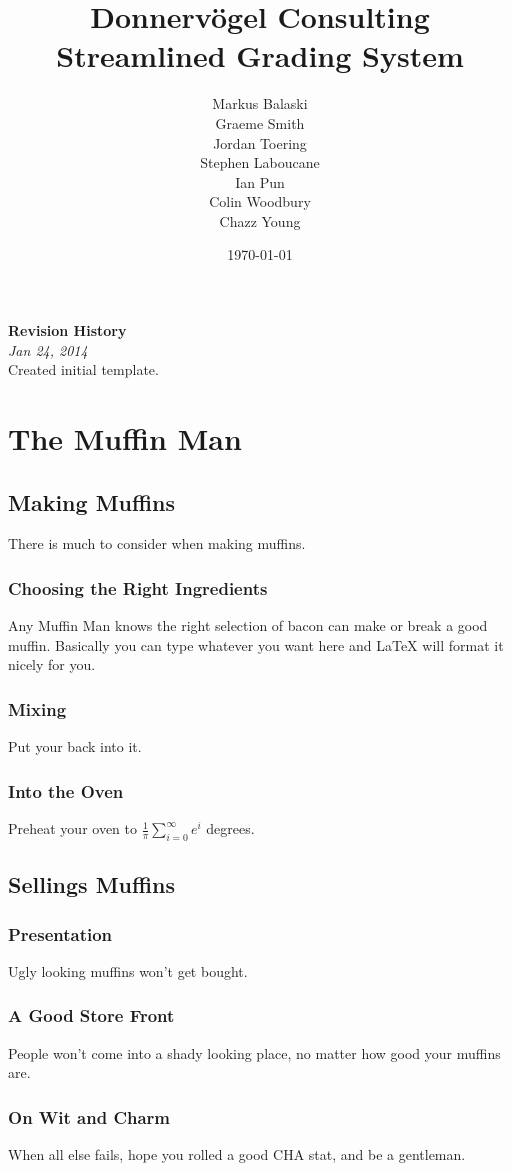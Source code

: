 \documentclass{article}
\begin{document}
\title{Donnervögel Consulting \\ Streamlined Grading System}
\author{Markus Balaski \\ Graeme Smith \\ Jordan Toering \\ Stephen Laboucane \\ Ian Pun \\ Colin Woodbury \\ Chazz Young}
\date{\today}
\maketitle
\clearpage

\textbf{Revision History}\\
\emph{Jan 24, 2014}\\
Created initial template.
\clearpage

\tableofcontents
\clearpage

\section{The Muffin Man}
\subsection{Making Muffins}
There is much to consider when making muffins.
\subsubsection{Choosing the Right Ingredients}
Any Muffin Man knows the right selection of bacon can make or break a good
muffin. Basically you can type whatever you want here and LaTeX will format it
nicely for you.
\subsubsection{Mixing}
Put your back into it.
\subsubsection{Into the Oven}
Preheat your oven to $\frac{1}{\pi}\sum_{i=0}^{\infty}e^i$ degrees.
\subsection{Sellings Muffins}
\subsubsection{Presentation}
Ugly looking muffins won't get bought.
\subsubsection{A Good Store Front}
People won't come into a shady looking place, no matter how good your muffins are.
\subsubsection{On Wit and Charm}
When all else fails, hope you rolled a good CHA stat, and be a gentleman.
\end{document}
